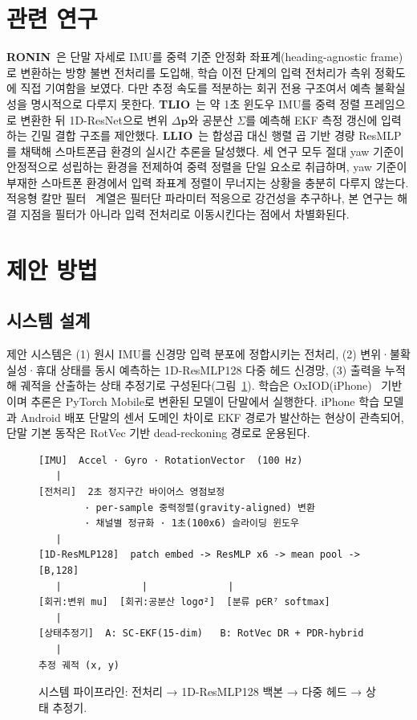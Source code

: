 \documentclass[10pt,twocolumn,a4paper]{article}
\begin{document}
\section{관련 연구}
\textbf{RONIN}~\cite{ronin}은 단말 자세로 IMU를 중력 기준 안정화 좌표계(heading-agnostic frame)로 변환하는 방향 불변 전처리를 도입해, 학습 이전 단계의 입력 전처리가 측위 정확도에 직접 기여함을 보였다. 다만 추정 속도를 적분하는 회귀 전용 구조여서 예측 불확실성을 명시적으로 다루지 못한다. \textbf{TLIO}~\cite{tlio}는 약 1초 윈도우 IMU를 중력 정렬 프레임으로 변환한 뒤 1D-ResNet으로 변위 $\Delta\mathbf{p}$와 공분산 $\Sigma$를 예측해 EKF 측정 갱신에 입력하는 긴밀 결합 구조를 제안했다. \textbf{LLIO}~\cite{llio}는 합성곱 대신 행렬 곱 기반 경량 ResMLP를 채택해 스마트폰급 환경의 실시간 추론을 달성했다. 세 연구 모두 절대 yaw 기준이 안정적으로 성립하는 환경을 전제하여 중력 정렬을 단일 요소로 취급하며, yaw 기준이 부재한 스마트폰 환경에서 입력 좌표계 정렬이 무너지는 상황을 충분히 다루지 않는다. 적응형 칼만 필터~\cite{akf} 계열은 필터단 파라미터 적응으로 강건성을 추구하나, 본 연구는 해결 지점을 필터가 아니라 입력 전처리로 이동시킨다는 점에서 차별화된다.

\section{제안 방법}
\subsection{시스템 설계}
제안 시스템은 (1) 원시 IMU를 신경망 입력 분포에 정합시키는 전처리, (2) 변위·불확실성·휴대 상태를 동시 예측하는 1D-ResMLP128 다중 헤드 신경망, (3) 출력을 누적해 궤적을 산출하는 상태 추정기로 구성된다(그림~\ref{fig:pipeline}). 학습은 OxIOD(iPhone)~\cite{oxiod} 기반이며 추론은 PyTorch Mobile로 변환된 모델이 단말에서 실행한다. iPhone 학습 모델과 Android 배포 단말의 센서 도메인 차이로 EKF 경로가 발산하는 현상이 관측되어, 단말 기본 동작은 RotVec 기반 dead-reckoning 경로로 운용된다.

\begin{figure}[t]
\centering
\footnotesize
\begin{verbatim}
[IMU]  Accel · Gyro · RotationVector  (100 Hz)
   |
[전처리]  2초 정지구간 바이어스 영점보정
        · per-sample 중력정렬(gravity-aligned) 변환
        · 채널별 정규화 · 1초(100x6) 슬라이딩 윈도우
   |
[1D-ResMLP128]  patch embed -> ResMLP x6 -> mean pool -> [B,128]
   |              |              |
[회귀:변위 mu]  [회귀:공분산 logσ²]  [분류 p∈R⁷ softmax]
   |
[상태추정기]  A: SC-EKF(15-dim)   B: RotVec DR + PDR-hybrid
   |
추정 궤적 (x, y)
\end{verbatim}
\caption{시스템 파이프라인: 전처리 → 1D-ResMLP128 백본 → 다중 헤드 → 상태 추정기.}
\label{fig:pipeline}
\end{figure}
\end{document}
